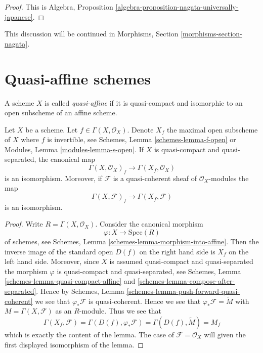 \begin{proof}
This is
Algebra, Proposition \ref{algebra-proposition-nagata-universally-japanese}.
\end{proof}

\noindent
This discussion will be continued in
Morphisms, Section \ref{morphisms-section-nagata}.



\section{Quasi-affine schemes}
\label{section-quasi-affine}

\begin{definition}
\label{definition-quasi-affine}
A scheme $X$ is called {\it quasi-affine} if it is quasi-compact
and isomorphic to an open subscheme of an affine scheme.
\end{definition}

\begin{lemma}
\label{lemma-invert-f-sections}
Let $X$ be a scheme. Let $f \in \Gamma(X, \mathcal{O}_X)$.
Denote $X_f$ the maximal open subscheme of $X$ where $f$ is invertible, see
Schemes, Lemma \ref{schemes-lemma-f-open} or
Modules, Lemma \ref{modules-lemma-s-open}.
If $X$ is quasi-compact and quasi-separated, the canonical map
$$
\Gamma(X, \mathcal{O}_X)_f \longrightarrow \Gamma(X_f, \mathcal{O}_X)
$$
is an isomorphism. Moreover, if $\mathcal{F}$ is a quasi-coherent
sheaf of $\mathcal{O}_X$-modules the map
$$
\Gamma(X, \mathcal{F})_f \longrightarrow \Gamma(X_f, \mathcal{F})
$$
is an isomorphism.
\end{lemma}

\begin{proof}
Write $R = \Gamma(X, \mathcal{O}_X)$.
Consider the canonical morphism
$$
\varphi : X \longrightarrow \text{Spec}(R)
$$
of schemes, see
Schemes, Lemma
\ref{schemes-lemma-morphism-into-affine}.
Then the inverse image of the standard open $D(f)$ on the
right hand side is $X_f$ on the left hand side.
Moreover, since $X$ is assumed quasi-compact and quasi-separated
the morphism $\varphi$ is quasi-compact and quasi-separated,
see Schemes, Lemma \ref{schemes-lemma-quasi-compact-affine} and
\ref{schemes-lemma-compose-after-separated}. Hence by
Schemes, Lemma \ref{schemes-lemma-push-forward-quasi-coherent}
we see that $\varphi_*\mathcal{F}$ is quasi-coherent.
Hence we see that $\varphi_*\mathcal{F} = \widetilde M$
with $M = \Gamma(X, \mathcal{F})$ as an $R$-module.
Thus we see that
$$
\Gamma(X_f, \mathcal{F}) =
\Gamma(D(f), \varphi_*\mathcal{F}) =
\Gamma(D(f), \widetilde M) = M_f
$$
which is exactly the content of the lemma. The case of
$\mathcal{F} = \mathcal{O}_X$ will given the first displayed isomorphism
of the lemma.
\end{proof}

